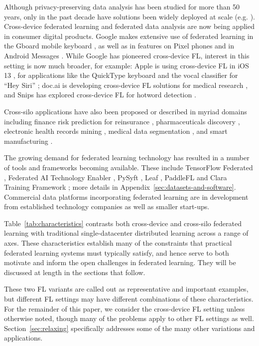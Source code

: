 Although privacy-preserving data analysis has been studied for more than 50 years, only in the past decade have solutions been widely deployed at scale (e.g. \citep{rappor:15,applewhitepaper:17}). Cross-device federated learning and federated data analysis are now being applied in consumer digital products. Google makes extensive use of federated learning in the Gboard mobile keyboard \citep{sundar2019nyt,hard18gboard,yang18gboardquery,chen19oov,ramaswamy19emoji}, as well as in features on Pixel phones \citep{googleai18settingssearch} and in Android Messages \citep{messages19privacy}. While Google has pioneered cross-device FL, interest in this setting is now much broader, for example: Apple is using cross-device FL in iOS 13 \citep{apple19neurips}, for applications like the QuickType keyboard and the vocal classifier for ``Hey Siri'' \citep{apple19wwdc};  doc.ai is developing cross-device FL solutions for medical research \citep{docai}, and Snips has explored cross-device FL for hotword detection \citep{leroy2018federated}.

Cross-silo applications have also been proposed or described in myriad domains including finance risk prediction for reinsurance \citep{webankswissre19reinsurance}, pharmaceuticals discovery \citep{melloddy19pharma}, electronic health records mining \citep{featurecloud19ehr}, medical data segmentation \citep{intel19medicalimaging, courtiol2019deep}, and smart manufacturing \citep{musketeer19mfg}.

The growing demand for federated learning technology has resulted in a number of tools and frameworks becoming available. These include TensorFlow Federated \citep{tff}, Federated AI Technology Enabler \citep{FATE}, PySyft \citep{PySyft}, Leaf \citep{Leaf}, PaddleFL \citep{PaddleFL} and Clara Training Framework \citep{ClaraTraining};
more details in Appendix~\ref{sec:datasets-and-software}. Commercial data platforms incorporating federated learning are in development from established technology companies as well as smaller start-ups.

Table~\ref{tab:characteristics} contrasts both cross-device and cross-silo federated learning with traditional single-datacenter distributed learning across a range of axes. These characteristics establish many of the constraints that practical federated learning systems must typically satisfy, and hence serve to both motivate and inform the open challenges in federated learning. They will be discussed at length in the sections that follow.

These two FL variants are called out as representative and important examples, but different FL settings may have different combinations of these characteristics. For the remainder of this paper, we consider the cross-device FL setting unless otherwise noted, though many of the problems apply to other FL settings as well. Section~\ref{sec:relaxing} specifically addresses some of the many other variations and applications.

